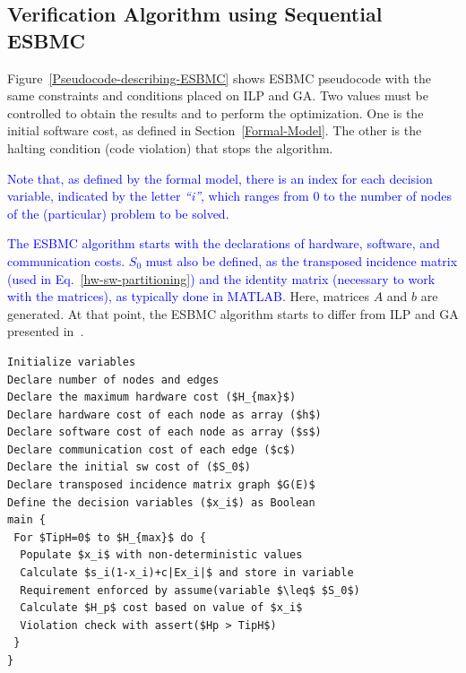 \documentclass{doublecol-new}
\theoremstyle{TH}{
\newtheorem{lemma}{Lemma}
\newtheorem{theorem}[lemma]{Theorem}
\newtheorem{corrolary}[lemma]{Corrolary}
\newtheorem{conjecture}[lemma]{Conjecture}
\newtheorem{proposition}[lemma]{Proposition}
\newtheorem{claim}[lemma]{Claim}
\newtheorem{stheorem}[lemma]{Wrong Theorem}
\newtheorem{algorithm}{Algorithm}
}
\theoremstyle{THrm}{
\newtheorem{definition}{Definition}[section]
\newtheorem{question}{Question}[section]
\newtheorem{remark}{Remark}
\newtheorem{scheme}{Scheme}
}
\theoremstyle{THhit}{
\newtheorem{case}{Case}[section]
}
\begin{document}
\subsection{Verification Algorithm using Sequential ESBMC}
\label{Verification-Algorithm-using-ESBMC}

Figure~\ref{Pseudocode-describing-ESBMC} shows ESBMC pseudocode with the same constraints and conditions placed on ILP and GA. Two values must be controlled to obtain the results and to perform the optimization. One is the initial software cost, as defined in Section~\ref{Formal-Model}. The other is the halting condition (code violation) that stops the algorithm.

\textcolor{blue}{Note that, as defined by the formal model, there is an index for each decision variable, indicated by the letter \textit{``i''}, which ranges from $0$ to the number of nodes of the (particular) problem to be solved.} 


\textcolor{blue}{The ESBMC algorithm starts with the declarations of hardware, software, and communication costs. $S_0$ must also be defined, as the transposed incidence matrix (used in Eq.~\eqref{hw-sw-partitioning}) and the identity matrix (necessary to work with the matrices), as typically done in MATLAB.} Here, matrices $A$ and $b$ are generated. At that point, the ESBMC algorithm starts to differ from ILP and GA presented in~\cite{Trindade2015}.

\begin{lstlisting}[basicstyle=\footnotesize,caption={Pseudocode describing sequential ESBMC.},label={Pseudocode-describing-ESBMC},numbersep=7pt,frame=tb,captionpos=t,numberstyle=\tiny,mathescape=true]
Initialize variables 
Declare number of nodes and edges
Declare the maximum hardware cost ($H_{max}$)
Declare hardware cost of each node as array ($h$)
Declare software cost of each node as array ($s$)
Declare communication cost of each edge ($c$)
Declare the initial sw cost of ($S_0$)
Declare transposed incidence matrix graph $G(E)$
Define the decision variables ($x_i$) as Boolean
main {
 For $TipH=0$ to $H_{max}$ do {
  Populate $x_i$ with non-deterministic values
  Calculate $s_i(1-x_i)+c|Ex_i|$ and store in variable
  Requirement enforced by assume(variable $\leq$ $S_0$)
  Calculate $H_p$ cost based on value of $x_i$
  Violation check with assert($Hp > TipH$)
 }
}
\end{lstlisting}
\end{document}
